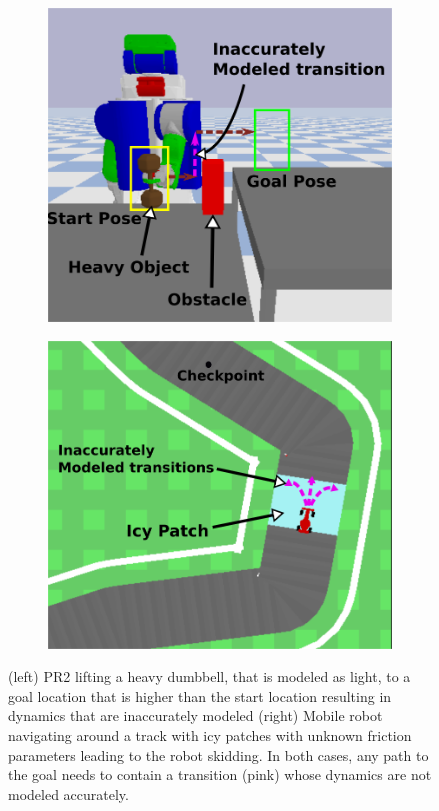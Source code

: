 \begin{figure}[t]
  \centering
  \begin{subfigure}{.4\columnwidth}
    \includegraphics[width=\linewidth]{figures/cmaxpp/intro_grasp_new.png}
  \end{subfigure}
  \hspace{10mm}
  \begin{subfigure}{.4\columnwidth}
    \includegraphics[width=\linewidth]{figures/cmaxpp/intro_car_new.png}
  \end{subfigure} 
  \caption{(left) PR2 lifting a heavy dumbbell, that is modeled as
    light, to a goal location that is higher than the start location
    resulting in dynamics that are inaccurately modeled (right) Mobile robot
    navigating around a track with icy patches with unknown friction parameters
    leading to the robot skidding. In both cases, any path to the goal
    needs to contain a
    transition (pink) whose dynamics are not modeled accurately.}
  \label{fig:intro}
\end{figure}

